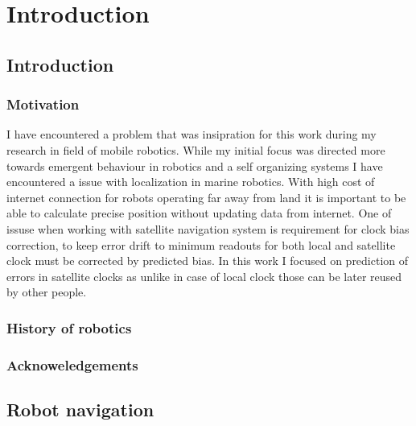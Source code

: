 \chapter{Introduction}


\section{Introduction}

\subsection{Motivation}
I have encountered a problem that was insipration for this work during my research in field
of mobile robotics. While my initial focus was directed more towards emergent behaviour in 
robotics and a self organizing systems I have encountered a issue with localization in marine 
robotics. With high cost of internet connection for robots operating far away from land it 
is important to be able to calculate precise position without updating data from internet.
One of issuse when working with satellite navigation system is requirement for clock bias
correction, to keep error drift to minimum readouts for both local and satellite clock must
be corrected by predicted bias. In this work I focused on prediction of errors in satellite
clocks as unlike in case of local clock those can be later reused by other people.


\subsection{History of robotics}


\subsection{Acknoweledgements}

\section{Robot navigation}

